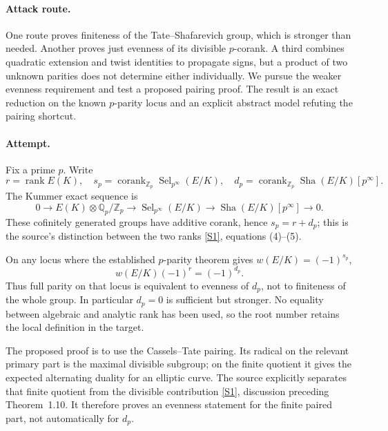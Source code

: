 \documentclass[11pt,a4paper]{article}
\newcommand{\Z}{\mathbb{Z}}
\newcommand{\Q}{\mathbb{Q}}
\newcommand{\sref}[2]{\hyperlink{source:#1:#2}{[S#2]}}
\numberwithin{equation}{section}
\begin{document}
\paragraph{Attack route.}
One route proves finiteness of the Tate--Shafarevich group, which is stronger than needed. Another proves just evenness of its divisible $p$-corank. A third combines quadratic extension and twist identities to propagate signs, but a product of two unknown parities does not determine either individually. We pursue the weaker evenness requirement and test a proposed pairing proof. The result is an exact reduction on the known $p$-parity locus and an explicit abstract model refuting the pairing shortcut.

\paragraph{Attempt.}
Fix a prime $p$. Write
\[
 r=\operatorname{rank}E(K),\quad s_p=\operatorname{corank}_{\Z_p}
       \operatorname{Sel}_{p^\infty}(E/K),\quad
 d_p=\operatorname{corank}_{\Z_p}\operatorname{Sha}(E/K)[p^\infty].
\]
The Kummer exact sequence is
\begin{equation}\label{eq196:selmer}
 0\longrightarrow E(K)\otimes\Q_p/\Z_p
 \longrightarrow\operatorname{Sel}_{p^\infty}(E/K)
 \longrightarrow\operatorname{Sha}(E/K)[p^\infty]\longrightarrow0.
\end{equation}
These cofinitely generated groups have additive corank, hence $s_p=r+d_p$; this is the source's distinction between the two ranks \sref{statement}{1}, equations (4)--(5).

On any locus where the established $p$-parity theorem gives $w(E/K)=(-1)^{s_p}$,
\begin{equation}\label{eq196:defect}
 w(E/K)(-1)^r=(-1)^{d_p}.
\end{equation}
Thus full parity on that locus is equivalent to evenness of $d_p$, not to finiteness of the whole group. In particular $d_p=0$ is sufficient but stronger. No equality between algebraic and analytic rank has been used, so the root number retains the local definition in the target.

The proposed proof is to use the Cassels--Tate pairing. Its radical on the relevant primary part is the maximal divisible subgroup; on the finite quotient it gives the expected alternating duality for an elliptic curve. The source explicitly separates that finite quotient from the divisible contribution \sref{statement}{1}, discussion preceding Theorem~1.10. It therefore proves an evenness statement for the finite paired part, not automatically for $d_p$.
\end{document}
